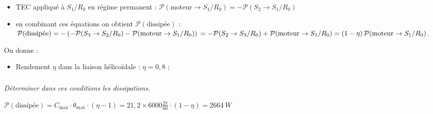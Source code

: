 \documentclass[10pt,fleqn]{article} %
\begin{document}
\begin{multicols}{2}
\begin{corrige}
\begin{itemize}
\item TEC appliqué à $S_1/R_0$ en régime permanent :
$\mathcal{P}(\text{moteur}\to S_1/R_0)=-\mathcal{P}(S_2\to S_1/R_0)$
\item en combinant ces équations on obtient $\mathcal{P}(\text{dissipée})$ : 
$\mathcal{P}(\text{dissipée})=-\left(-\mathcal{P}(S_3\to S_2/R_0)-\mathcal{P}(\text{moteur}\to S_1/R_0)\right)\\
=-\mathcal{P}(S_2\to S_3/R_0)+\mathcal{P}(\text{moteur}\to S_1/R_0)=\left(1-\eta\right)\mathcal{P}(\text{moteur}\to S_1/R_0)$.
\end{itemize}
\end{corrige}\else\fi

\vspace{.5cm}
On donne : 
\begin{itemize}
\item Rendement $\eta$ dans la liaison hélicoïdale : $\eta=0,8$ ; 
\end{itemize}

\subparagraph{}\textit{Déterminer dans ces conditions les dissipations.}

\ifprof\begin{corrige}
$
\mathcal{P}(\text{dissipée})=C_{\text{max}}\cdot \dot{\theta}_{\text{max}}\cdot \left(\eta-1\right)
=21,2\times6000\frac{2\pi}{60}\cdot \left(1-\eta\right)=\SI{2664}{W}
$
\end{corrige}\else\fi




\ifprof
\else
\end{multicols}
\fi
\end{document}
